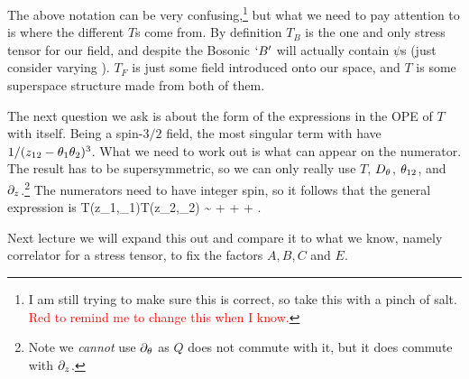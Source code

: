 \br 
\label{rem:TBTFConfusion}
    The above notation can be very confusing,\footnote{I am still trying to make sure this is correct, so take this with a pinch of salt. \textcolor{red}{Red to remind me to change this when I know.}} but what we need to pay attention to is where the different $T$s come from. By definition $T_B$ is the one and only stress tensor for our field, and despite the Bosonic $`B'$ will actually contain $\psi$s (just consider varying ). $T_F$ is just some field introduced onto our space, and $T$ is some superspace structure made from both of them. 
\er 

The next question we ask is about the form of the expressions in the OPE of $T$ with itself. Being a spin-$3/2$ field, the most singular term with have $1/(z_{12}-\theta_1\theta_2)^3$. What we need to work out is what can appear on the numerator. The result has to be supersymmetric, so we can only really use $T$, $D_{\theta}$, $\theta_{12}$,  and $\partial_z$.\footnote{Note we \textit{cannot} use $\partial_{\theta}$ as $Q$ does not commute with it, but it does commute with $\partial_z$.} The numerators need to have integer spin, so it follows that the general expression is 
\bse 
    T(z_1,\th_1)T(z_2,\th_2) \sim {} +  +  + .
\ese 

Next lecture we will expand this out and compare it to what we know, namely correlator for a stress tensor, to fix the factors $A,B,C$ and $E$. 